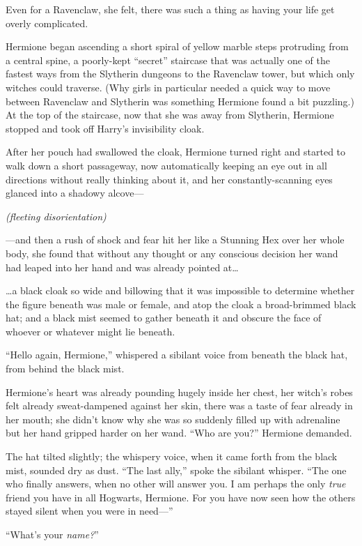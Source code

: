 Even for a Ravenclaw, she felt, there was such a thing as having your life get
overly complicated.

Hermione began ascending a short spiral of yellow marble steps protruding from
a central spine, a poorly-kept “secret” staircase that was actually one of the
fastest ways from the Slytherin dungeons to the Ravenclaw tower, but which
only witches could traverse. (Why girls in particular needed a quick way to
move between Ravenclaw and Slytherin was something Hermione found a bit
puzzling.) At the top of the staircase, now that she was away from Slytherin,
Hermione stopped and took off Harry’s invisibility cloak.

After her pouch had swallowed the cloak, Hermione turned right and started to
walk down a short passageway, now automatically keeping an eye out in all
directions without really thinking about it, and her constantly-scanning eyes
glanced into a shadowy alcove—

\emph{(fleeting disorientation)}

—and then a rush of shock and fear hit her like a Stunning Hex over her whole
body, she found that without any thought or any conscious decision her wand had
leaped into her hand and was already pointed at…

…a black cloak so wide and billowing that it was impossible to determine
whether the figure beneath was male or female, and atop the cloak a
broad-brimmed black hat; and a black mist seemed to gather beneath it and
obscure the face of whoever or whatever might lie beneath.

“Hello again, Hermione,” whispered a sibilant voice from beneath the black hat,
from behind the black mist.

Hermione’s heart was already pounding hugely inside her chest, her witch’s
robes felt already sweat-dampened against her skin, there was a taste of fear
already in her mouth; she didn’t know why she was so suddenly filled up with
adrenaline but her hand gripped harder on her wand. “Who are you?” Hermione
demanded.

The hat tilted slightly; the whispery voice, when it came forth from the black
mist, sounded dry as dust. “The last ally,” spoke the sibilant whisper. “The
one who finally answers, when no other will answer you. I am perhaps the only
\emph{true} friend you have in all Hogwarts, Hermione. For you have now seen
how the others stayed silent when you were in need—”

“What’s your \emph{name?}”

